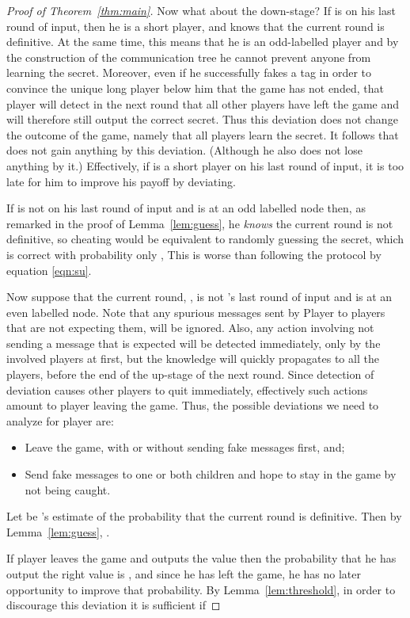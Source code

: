 \documentclass[12pt]{article}
\theoremstyle{definition}
\begin{document}
\begin{proof}[Proof of Theorem~\ref{thm:main}]
Now what about the down-stage? If  is on his last round of input, then he 
is a short player, and knows that the current round is definitive. At the same 
time, this means that he is an odd-labelled player and by the construction 
of the communication tree he cannot prevent anyone from learning the secret. 
Moreover, even if he successfully fakes a tag in order to convince the unique
long player below him that the game has not ended, that player will detect 
in the next round that all other players have left the game and will 
therefore still output the correct secret. Thus this deviation does not 
change the outcome of the game, namely that all players learn the secret. 
It follows that  does not gain anything 
by this deviation. (Although he also does not lose anything by it.) 
Effectively, if  is a short player on his 
last round of input, it is too late for him to improve his payoff by deviating.


If  is not on his last round of input and is at an odd labelled node then, 
as remarked in the proof of Lemma~\ref{lem:guess}, he \emph{knows} the current 
round is not definitive, so cheating would be equivalent to randomly guessing 
the secret, which is correct with probability only , This is worse than following the protocol by equation \eqref{eqn:su}.

Now suppose that the current round, , is not 's last round of input 
and  is at an even labelled node.  Note that any spurious messages sent by Player  to players that are not expecting them, will be ignored.  Also, any action involving not sending a message that is expected will be 
detected immediately, only by the involved players at first, but the knowledge will quickly 
propagates to all the players, before the end of the up-stage of the next 
round. Since detection of deviation causes other players to quit immediately, 
effectively such actions amount to player  leaving the game.  
Thus, the possible deviations we need to analyze for player  are:
\begin{itemize}
\item Leave the game, with or without sending fake messages first, and;
\item Send fake messages to one or both children and hope to stay in the 
game by not being caught.
\end{itemize}

Let 
be 's estimate of the probability that the current round is definitive. 
Then by Lemma~\ref{lem:guess},  . 

If player  leaves the game and outputs the value  then the probability 
that he has output the right value is , and since he 
has left the game, he has no later opportunity to improve that probability.
By Lemma~\ref{lem:threshold}, in order to discourage this deviation it is 
sufficient if 



\end{proof}
\end{document}
